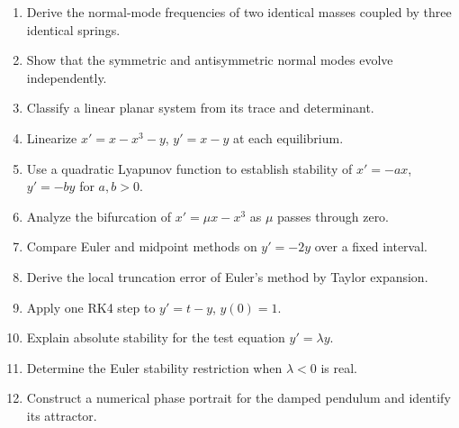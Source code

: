 \begin{enumerate}[label=\textbf{\arabic*.},leftmargin=*]
\item Derive the normal-mode frequencies of two identical masses coupled by three identical springs.
\item Show that the symmetric and antisymmetric normal modes evolve independently.
\item Classify a linear planar system from its trace and determinant.
\item Linearize $x'=x-x^3-y$, $y'=x-y$ at each equilibrium.
\item Use a quadratic Lyapunov function to establish stability of $x'=-ax$, $y'=-by$ for $a,b>0$.
\item Analyze the bifurcation of $x'=\mu x-x^3$ as $\mu$ passes through zero.
\item Compare Euler and midpoint methods on $y'=-2y$ over a fixed interval.
\item Derive the local truncation error of Euler's method by Taylor expansion.
\item Apply one RK4 step to $y'=t-y$, $y(0)=1$.
\item Explain absolute stability for the test equation $y'=\lambda y$.
\item Determine the Euler stability restriction when $\lambda<0$ is real.
\item Construct a numerical phase portrait for the damped pendulum and identify its attractor.
\end{enumerate}

